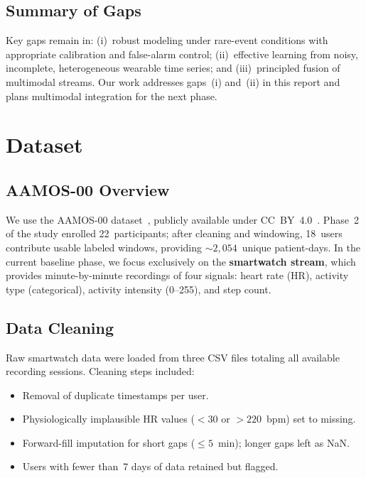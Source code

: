 \documentclass[11pt,a4paper]{article}
\begin{document}
\subsection{Summary of Gaps}

Key gaps remain in: (i)~robust modeling under rare-event conditions with
appropriate calibration and false-alarm control; (ii)~effective learning from
noisy, incomplete, heterogeneous wearable time series; and (iii)~principled
fusion of multimodal streams.  Our work addresses gaps~(i) and~(ii) in this
report and plans multimodal integration for the next phase.

\section{Dataset}\label{sec:dataset}

\subsection{AAMOS-00 Overview}

We use the AAMOS-00 dataset~\cite{tsang2023}, publicly available under
CC~BY~4.0~\cite{datashare}.  Phase~2 of the study enrolled 22~participants;
after cleaning and windowing, 18~users contribute usable labeled windows,
providing ${\sim}2{,}054$~unique patient-days.  In the current baseline
phase, we focus exclusively on the \textbf{smartwatch stream}, which provides
minute-by-minute recordings of four signals: heart rate (HR), activity type
(categorical), activity intensity (0--255), and step count.

\subsection{Data Cleaning}

Raw smartwatch data were loaded from three CSV files totaling all available
recording sessions.  Cleaning steps included:

\begin{itemize}[nosep]
  \item Removal of duplicate timestamps per user.
  \item Physiologically implausible HR values (${<}30$ or ${>}220$~bpm) set to
        missing.
  \item Forward-fill imputation for short gaps (${\leq}5$~min); longer gaps
        left as NaN.
  \item Users with fewer than~7 days of data retained but flagged.
\end{itemize}
\end{document}
